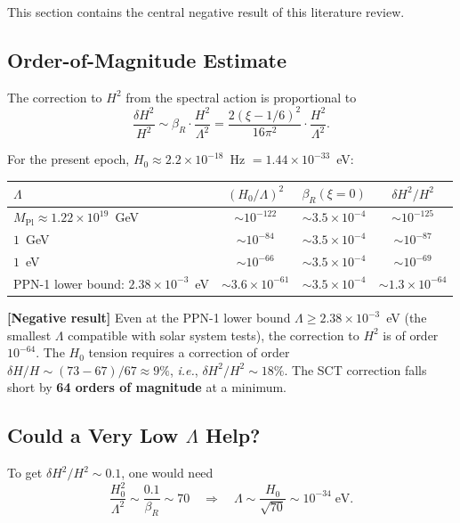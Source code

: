 \documentclass[11pt,a4paper]{article}
\theoremstyle{plain}
\theoremstyle{definition}
\theoremstyle{remark}
\newcommand{\ie}{\textit{i.e.}}
\newcommand{\negativeresult}[1]{%
  \par\smallskip\noindent
  \colorbox{orange!10}{\parbox{\dimexpr\linewidth-2\fboxsep}{%
    \textcolor{orange!60!black}{\textbf{[Negative result]}} #1}}%
  \par\smallskip}
\begin{document}
This section contains the central negative result of this literature
review.

\subsection{Order-of-Magnitude Estimate}

The correction to $H^2$ from the spectral action is proportional to
\begin{equation}\label{eq:suppression}
  \frac{\delta H^2}{H^2} \sim \beta_R \cdot \frac{H^2}{\Lambda^2}
  = \frac{2(\xi - 1/6)^2}{16\pi^2} \cdot \frac{H^2}{\Lambda^2}.
\end{equation}

For the present epoch, $H_0 \approx 2.2 \times 10^{-18}$~Hz
$= 1.44 \times 10^{-33}$~eV:

\begin{center}
\begin{tabular}{lccc}
\toprule
$\Lambda$ & $(H_0/\Lambda)^2$ & $\beta_R(\xi=0)$ & $\delta H^2/H^2$ \\
\midrule
$M_{\mathrm{Pl}} \approx 1.22 \times 10^{19}$~GeV
  & $\sim 10^{-122}$ & $\sim 3.5 \times 10^{-4}$ & $\sim 10^{-125}$ \\
$1$~GeV & $\sim 10^{-84}$ & $\sim 3.5 \times 10^{-4}$ & $\sim 10^{-87}$ \\
$1$~eV & $\sim 10^{-66}$ & $\sim 3.5 \times 10^{-4}$ & $\sim 10^{-69}$ \\
PPN-1 lower bound: $2.38 \times 10^{-3}$~eV
  & $\sim 3.6 \times 10^{-61}$ & $\sim 3.5 \times 10^{-4}$ & $\sim 1.3 \times 10^{-64}$ \\
\bottomrule
\end{tabular}
\end{center}

\negativeresult{Even at the PPN-1 lower bound $\Lambda \geq 2.38 \times
10^{-3}$~eV (the smallest $\Lambda$ compatible with solar system tests),
the correction to $H^2$ is of order $10^{-64}$. The $H_0$ tension
requires a correction of order $\delta H/H \sim (73 - 67)/67 \approx 9\%$,
\ie, $\delta H^2/H^2 \sim 18\%$. The SCT correction falls short by
\textbf{64 orders of magnitude} at a minimum.}

\subsection{Could a Very Low $\Lambda$ Help?}

To get $\delta H^2/H^2 \sim 0.1$, one would need
\begin{equation}
  \frac{H_0^2}{\Lambda^2} \sim \frac{0.1}{\beta_R} \sim 70
  \quad\Longrightarrow\quad
  \Lambda \sim \frac{H_0}{\sqrt{70}} \sim 10^{-34}\;\text{eV}.
\end{equation}
\end{document}

